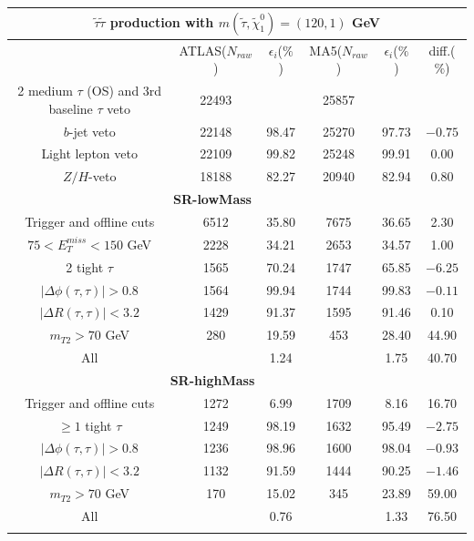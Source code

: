 \documentclass{ws-mpla}
\begin{document}
\begin{table}[h!]
  {\begin{tabular}{@{}c c c c c c@{}} \toprule
\hline
\multicolumn{6}{c}{ \textbf{$ \tilde{\tau}\tilde{\tau} $ production with $ m(\tilde{\tau},\tilde{\chi}^0_1) = (120,1) $ GeV} }\\
\hline\hline
 & ATLAS($N_{raw}$) & $\epsilon_i$($\%$) & MA5($N_{raw}$) & $\epsilon_i$($\%$) & diff.($\%$) \\
\hline\hline

2 medium $\tau$ (OS) and 3rd baseline $\tau$ veto & 22493 & & 25857 & & \\ \hline
$b$-jet veto & 22148 & 98.47 & 25270 & 97.73 & $-0.75$ \\ \hline
Light lepton veto & 22109 & 99.82 & 25248 & 99.91 & 0.00 \\ \hline
$Z/H$-veto & 18188 & 82.27 & 20940 & 82.94 & 0.80 \\ \hline
%
\multicolumn{5}{c}{ \textbf{SR-lowMass} }\\\hline
%
Trigger and offline cuts & 6512 & 35.80 & 7675 & 36.65 & 2.30 \\ \hline
$ 75 < E^{miss}_T < 150 $ GeV & 2228 & 34.21 & 2653 & 34.57 & 1.00 \\ \hline
2 tight $\tau$ & 1565 & 70.24 & 1747 & 65.85 & $-6.25$ \\ \hline
$ |\Delta\phi(\tau,\tau)| > 0.8 $ & 1564 & 99.94 & 1744 & 99.83 & $-0.11$ \\ \hline
$ |\Delta R(\tau,\tau)| < 3.2 $ & 1429 & 91.37 & 1595 & 91.46 & 0.10 \\ \hline
$ m_{T2} > 70 $ GeV & 280 & 19.59 & 453 & 28.40 & 44.90 \\ \hline
All &  & 1.24 &  & 1.75 & 40.70 \\ \hline
%
\hline
\multicolumn{5}{c}{ \textbf{SR-highMass} }\\\hline
%
Trigger and offline cuts & 1272 & 6.99 & 1709 & 8.16 & 16.70 \\ \hline
$ \geq 1 $ tight $\tau$ & 1249 & 98.19 & 1632 & 95.49 & $-2.75$ \\ \hline
$ |\Delta\phi(\tau,\tau)| > 0.8 $ & 1236 & 98.96 & 1600 & 98.04 & $-0.93$ \\ \hline
$ |\Delta R(\tau,\tau)| < 3.2 $ & 1132 & 91.59 & 1444 & 90.25 & $-1.46$ \\ \hline
$ m_{T2} > 70 $ GeV & 170 & 15.02 & 345 & 23.89 & 59.00 \\ \hline
All &  & 0.76 &  & 1.33 & 76.50 \\ \botrule
\end{tabular}
\label{tab:120GeV} }
\end{table}
\end{document}
